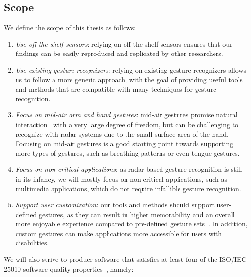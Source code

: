 \subsection{Scope}
We define the scope of this thesis as follows:
\begin{enumerate}[label=\textit{S\arabic*}]
    \item \textit{Use off-the-shelf sensors}: relying on off-the-shelf sensors ensures that our findings can be easily reproduced and replicated by other researchers.
    \item \textit{Use existing gesture recognizers}: relying on existing gesture recognizers allows us to follow a more generic approach, with the goal of providing useful tools and methods that are compatible with many techniques for gesture recognition.
    \item \textit{Focus on mid-air arm and hand gestures}: mid-air gestures promise natural interaction~\cite{Wigdor:2011} with a very large degree of freedom, but can be challenging to recognize with radar systems due to the small surface area of the hand. Focusing on mid-air gestures is a good starting point towards supporting more types of gestures, such as breathing patterns or even tongue gestures.
    \item \textit{Focus on non-critical applications}: as radar-based gesture recognition is still in its infancy, we will mostly focus on non-critical applications, such as multimedia applications, which do not require infallible gesture recognition.
    \item \textit{Support user customization}: our tools and methods should support user-defined gestures, as they can result in higher memorability and an overall more enjoyable experience compared to pre-defined gesture sets~\cite{Nacenta:2013}. In addition, custom gestures can make applications more accessible for users with disabilities.
\end{enumerate}
We will also strive to produce software that satisfies at least four of the ISO/IEC 25010 software quality properties~\cite{iso25010}, namely:
